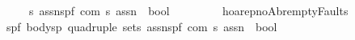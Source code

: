 \begin{isabellebody}
\ \ \ \ {\isacharprime}s\ assn{\isacharcomma}{\isacharparenleft}{\isacharprime}s{\isacharcomma}{\isacharprime}p{\isacharcomma}{\isacharprime}f{\isacharparenright}\ com{\isacharcomma}\ {\isacharprime}s\ assn{\isacharbrackright}\ {\isacharequal}{\isachargreater}\ bool{\isachardoublequoteclose}\isanewline
\ \ \ \ {\isacharparenleft}{\isachardoublequoteopen}{\isacharparenleft}{}{\isacharunderscore}{\isacharcomma}{\isacharunderscore}{\isacharslash}{\isasymturnstile}\isactrlbsub {\isacharprime}{\isacharslash}{\isacharunderscore}\isactrlesub \ {\isacharparenleft}{\isacharunderscore}{\isacharslash}\ {\isacharparenleft}{\isacharunderscore}{\isacharparenright}{\isacharslash}\ {\isacharunderscore}{\isacharparenright}{\isacharparenright}{\isachardoublequoteclose}\ {\isacharbrackleft}{}{}{\isacharcomma}{}{}{\isacharcomma}{}{}{\isacharcomma}{}{}{}{}{\isacharcomma}{}{}{\isacharcomma}{}{}{}{}{\isacharbrackright}{}{}{\isacharparenright}\isanewline
\isanewline
{\isachardoublequoteopen}{\isacharunderscore}hoarep{\isacharunderscore}noAbr{\isacharunderscore}emptyFaults{\isachardoublequoteclose}{\isacharcolon}{\isacharcolon}\isanewline
{\isachardoublequoteopen}{\isacharbrackleft}{\isacharparenleft}{\isacharprime}s{\isacharcomma}{\isacharprime}p{\isacharcomma}{\isacharprime}f{\isacharparenright}\ body{\isacharcomma}{\isacharparenleft}{\isacharprime}s{\isacharcomma}{\isacharprime}p{\isacharparenright}\ quadruple\ set{\isacharcomma}{\isacharprime}s\ assn{\isacharcomma}{\isacharparenleft}{\isacharprime}s{\isacharcomma}{\isacharprime}p{\isacharcomma}{\isacharprime}f{\isacharparenright}\ com{\isacharcomma}\ {\isacharprime}s\ assn{\isacharbrackright}\ {\isacharequal}{\isachargreater}\ bool{\isachardoublequoteclose}\isanewline
\ \ \ \ {\isacharparenleft}{\isachardoublequoteopen}{\isacharparenleft}{}{\isacharunderscore}{\isacharcomma}{\isacharunderscore}{\isacharslash}{\isasymturnstile}\ {\isacharparenleft}{\isacharunderscore}{\isacharslash}\ {\isacharparenleft}{\isacharunderscore}{\isacharparenright}{\isacharslash}\ {\isacharunderscore}{\isacharparenright}{\isacharparenright}{\isachardoublequoteclose}\ {\isacharbrackleft}{}{}{\isacharcomma}{}{}{\isacharcomma}{}{}{}{}{\isacharcomma}{}{}{\isacharcomma}{}{}{}{}{\isacharbrackright}{}{}{\isacharparenright}\isanewline

\end{isabellebody}
